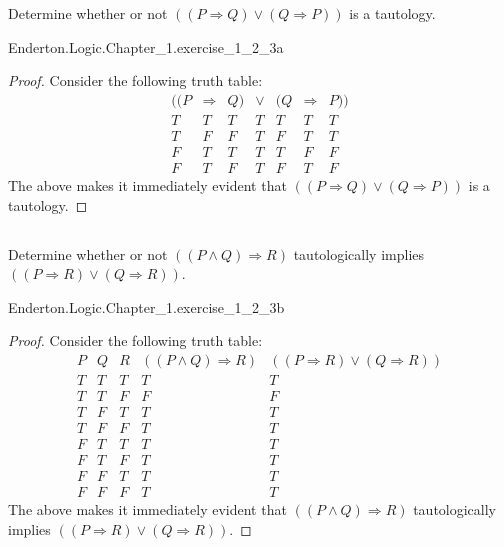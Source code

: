 \documentclass{report}
\begin{document}
  Determine whether or not $((P \Rightarrow Q) \lor (Q \Rightarrow P))$ is a
    tautology.

    {Enderton.Logic.Chapter\_1.exercise\_1\_2\_3a}

  \begin{proof}
    Consider the following truth table:
      $$\begin{array}{s|c|s|e|s|c|s}
        ((P & \Rightarrow & Q) & \lor & (Q & \Rightarrow & P)) \\
        \hline
        T & T & T & T & T & T & T \\
        T & F & F & T & F & T & T \\
        F & T & T & T & T & F & F \\
        F & T & F & T & F & T & F
      \end{array}$$
    The above makes it immediately evident that
      $((P \Rightarrow Q) \lor (Q \Rightarrow P))$ is a tautology.
  \end{proof}

\subsection{}%

  Determine whether or not $((P \land Q) \Rightarrow R)$ tautologically implies
    $((P \Rightarrow R) \lor (Q \Rightarrow R))$.

    {Enderton.Logic.Chapter\_1.exercise\_1\_2\_3b}

  \begin{proof}
    Consider the following truth table:
      $$\begin{array}{s|s|s|e|e}
        P & Q & R &
          ((P \land Q) \Rightarrow R) &
          ((P \Rightarrow R) \lor (Q \Rightarrow R)) \\
        \hline
        T & T & T & T & T \\
        T & T & F & F & F \\
        T & F & T & T & T \\
        T & F & F & T & T \\
        F & T & T & T & T \\
        F & T & F & T & T \\
        F & F & T & T & T \\
        F & F & F & T & T
      \end{array}$$
    The above makes it immediately evident that
      $((P \land Q) \Rightarrow R)$ tautologically implies
      $((P \Rightarrow R) \lor (Q \Rightarrow R))$.
  \end{proof}
\end{document}

